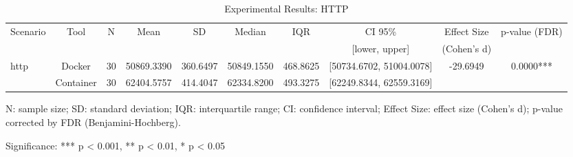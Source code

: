 \documentclass{article}
\begin{document}

\begin{table}[h]
\centering
\small
\caption{Experimental Results: HTTP}
\label{tab:http}
\begin{tabular}{lccccccccc}
\toprule
Scenario & Tool & N & Mean & SD & Median & IQR & CI 95\% & Effect Size & p-value (FDR) \\
 & & & & & & & [lower, upper] & (Cohen's d) & \\
\midrule
\multirow{2}{*}{http} & Docker & 30 & 50869.3390 & 360.6497 & 50849.1550 & 468.8625 & [50734.6702, 51004.0078] & -29.6949 & 0.0000*** \\
 & Container & 30 & 62404.5757 & 414.4047 & 62334.8200 & 493.3275 & [62249.8344, 62559.3169] &  &  \\
\midrule
\bottomrule
\end{tabular}
\begin{tablenotes}
\small
\item N: sample size; SD: standard deviation; IQR: interquartile range; CI: confidence interval; Effect Size: effect size (Cohen's d); p-value corrected by FDR (Benjamini-Hochberg).
\item Significance: *** p < 0.001, ** p < 0.01, * p < 0.05
\end{tablenotes}
\end{table}
\end{document}

